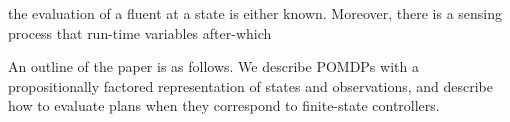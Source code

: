 the evaluation of a fluent at a state is either known. Moreover, there
is a sensing process that run-time variables  after-which 





An outline of the paper is as follows. We describe POMDPs with a
propositionally factored representation of states and observations,
and describe how to evaluate plans when they correspond to
finite-state controllers.

